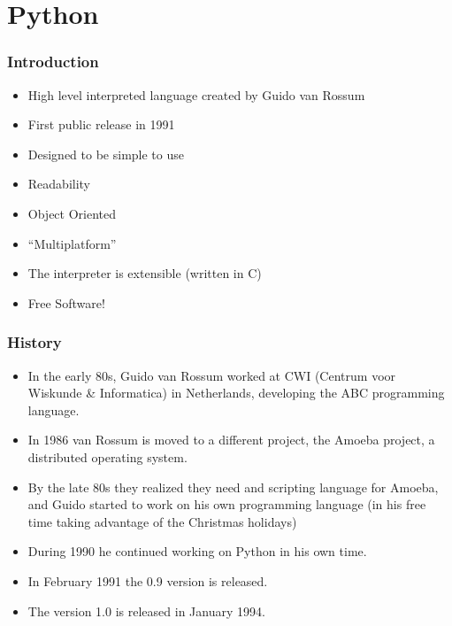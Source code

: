 \section{Python}

\begin{frame}
  \frametitle{Introduction}

  \begin{itemize}
  \item High level interpreted language created by Guido van Rossum
  \item First public release in 1991
  \item Designed to be simple to use
  \item Readability
  \item Object Oriented
  \item ``Multiplatform''
  \item The interpreter is extensible (written in C)
  \item Free Software!
  \end{itemize}
\end{frame}

\begin{frame}
  \frametitle{History}

  \begin{itemize}
  \item In the early 80s, Guido van Rossum worked at CWI (Centrum voor
    Wiskunde \& Informatica) in Netherlands, developing the ABC
    programming language.
  \item In 1986 van Rossum is moved to a different project, the Amoeba
    project, a distributed operating system.
  \item By the late 80s they realized they need and scripting language
    for Amoeba, and Guido started to work on his own programming
    language (in his free time taking advantage of the Christmas holidays)
  \item During 1990 he continued working on Python in his own time.
  \item In February 1991 the 0.9 version is released.
  \item The version 1.0 is released in January 1994.
  \end{itemize}
\end{frame}

